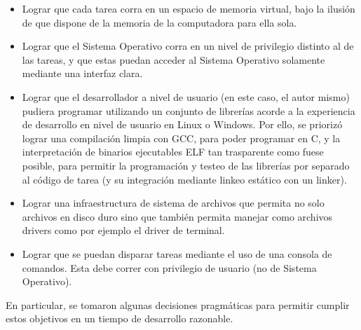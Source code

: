 \begin{itemize}
	\item Lograr que cada tarea corra en un espacio de memoria virtual, bajo
	la ilusi\'on de que dispone de la memoria de la computadora para ella sola.
	\item Lograr que el Sistema Operativo corra en un nivel de privilegio distinto
	al de las tareas, y que estas puedan acceder al Sistema Operativo solamente
	mediante una interfaz clara.
	\item Lograr que el desarrollador a nivel de usuario (en este caso, el autor
	mismo) pudiera programar utilizando un conjunto de librer\'ias acorde a
	la experiencia de desarrollo en nivel de usuario en Linux o Windows. Por ello,
	se prioriz\'o lograr una compilaci\'on limpia con GCC, para poder programar en C,
	y la interpretaci\'on de binarios ejecutables ELF tan trasparente como fuese posible,
	para permitir la programaci\'on y testeo de las librer\'ias por separado al c\'odigo de
	tarea (y su integraci\'on mediante linkeo est\'atico con un linker).
	\item Lograr una infraestructura de sistema de archivos que permita no solo archivos
	en disco duro sino que tambi\'en permita manejar como archivos drivers como por ejemplo
	el driver de terminal.
	\item Lograr que se puedan disparar tareas mediante el uso de una consola de comandos. 
	Esta debe correr con privilegio de usuario (no de Sistema Operativo).
\end{itemize}

En particular, se tomaron algunas decisiones pragm\'aticas para permitir cumplir estos objetivos
en un tiempo de desarrollo razonable.

